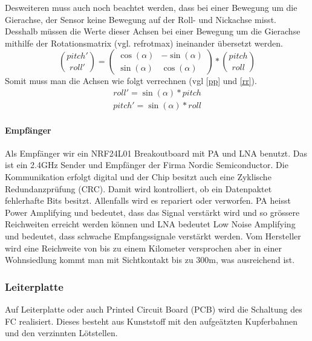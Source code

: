 \documentclass[12pt,a4paper, ngerman]{article}
\begin{document}
Desweiteren muss auch noch beachtet werden, dass bei einer Bewegung um die Gierachse, der Sensor keine Bewegung auf der Roll- und Nickachse misst. Desshalb müssen die Werte dieser Achsen bei einer Bewegung um die Gierachse mithilfe der Rotationsmatrix (vgl. ref{rotmax}) ineinander übersetzt werden.
\begin{equation}\label{rotmax}
\binom{pitch'}{roll'}=\begin{pmatrix}
\cos(\alpha) & -\sin(\alpha)\\ 
\sin(\alpha) & \cos(\alpha)
\end{pmatrix}*\binom{pitch}{roll}
\end{equation}
Somit muss man die Achsen wie folgt verrechnen (vgl \ref{pp} und \ref{rr}).
\begin{align}
roll' = \sin(\alpha)*pitch \label{pp}\\
pitch'= \sin(\alpha)*roll \label{rr}
\end{align} 

\paragraph{Empfänger}
Als Empfänger wir ein NRF24L01 Breakoutboard mit PA und LNA benutzt. Das ist ein 2.4GHz Sender und Empfänger der Firma Nordic Semiconductor. Die Kommunikation erfolgt digital und der Chip besitzt auch eine Zyklische Redundanzprüfung (CRC). Damit wird kontrolliert, ob ein Datenpaktet fehlerhafte Bits besitzt. Allenfalls wird es repariert oder verworfen. PA heisst Power Amplifying und bedeutet, dass das Signal verstärkt wird und so grössere Reichweiten erreicht werden können und LNA bedeutet Low Noise Amplifying und bedeutet, dass schwache Empfangssignale verstärkt werden.\cite{website:electronics.stackexchange.com_WhatisPALNA} Vom Hersteller wird eine Reichweite von bis zu einem Kilometer versprochen aber in einer Wohnsiedlung kommt man mit Sichtkontakt bis zu 300m, was ausreichend ist.

\subsubsection{Leiterplatte}
Auf Leiterplatte oder auch Printed Circuit Board (PCB) wird die Schaltung des FC realisiert. Dieses besteht aus Kunststoff mit den aufgeätzten Kupferbahnen und den verzinnten Lötstellen.
\end{document}
